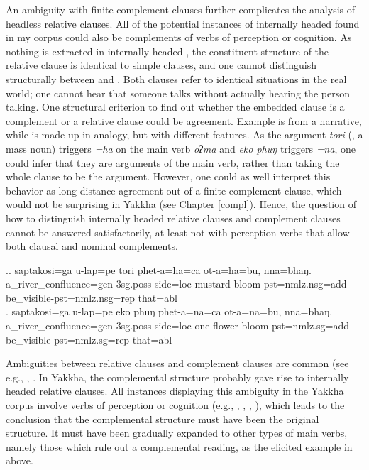 An ambiguity with finite complement clauses further complicates the analysis of headless relative clauses. All of the potential instances of internally headed  found in my corpus could also be complements of  verbs of perception or cognition. As nothing is extracted in internally headed , the constituent structure of the relative clause is identical to simple clauses, and one cannot distinguish structurally between  and . Both clauses refer to identical situations in the real world; one cannot hear that someone talks without actually hearing the person talking. One structural criterion to find out whether the embedded clause is a complement or a relative clause could be agreement. Example \Next[a] is from a narrative, while \Next[b] is made up in analogy, but with different  features. As the argument \emph{tori} (, a mass noun) triggers \emph{=ha}  on the main verb \emph{oʔma}  and \emph{eko phuŋ}  triggers \emph{=na}, one could infer that they are arguments of the main verb, rather than taking the whole clause to be the argument. However, one could as well interpret this behavior as long distance agreement out of a finite complement clause, which would not be surprising in Yakkha  (see Chapter \ref{compl}). Hence, the question of how to distinguish internally headed relative clauses and complement clauses cannot be answered satisfactorily, at least not with perception verbs that allow both clausal and nominal complements. 

\ex.\ag. saptakosi=ga u-lap=pe tori phet-a=ha=ca ot-a=ha=bu, nna=bhaŋ.\\
		a\_river\_confluence{\sc =gen} {\sc 3sg.poss}-side{\sc =loc} mustard bloom{\sc [3sg]-pst=nmlz.nsg=add}  be\_visible{\sc [3sg]-pst=nmlz.nsg=rep} that{\sc =abl}	\\
	  
 \bg.	saptakosi=ga u-lap=pe eko phuŋ phet-a=na=ca ot-a=na=bu, nna=bhaŋ.\\
		a\_river\_confluence{\sc =gen} {\sc 3sg.poss}-side{\sc =loc} one flower bloom{\sc [3sg]-pst=nmlz.sg=add}  be\_visible{\sc [3sg]-pst=nmlz.sg=rep} that{\sc =abl}	\\

Ambiguities between relative clauses and complement clauses are common (see e.g., \citet[272]{Bickel1999Nominalization}, \citet[120, 143]{Noonan2007Complementation}. In Yakkha, the complemental structure probably gave rise to internally headed relative clauses. All instances  displaying this ambiguity in the Yakkha corpus involve verbs of perception or cognition (e.g., , , , ), which leads to the conclusion that the complemental structure must have been the original structure. It must have been gradually expanded  to other types of main verbs, namely those which rule out a complemental reading, as the elicited example in \LLast above.





